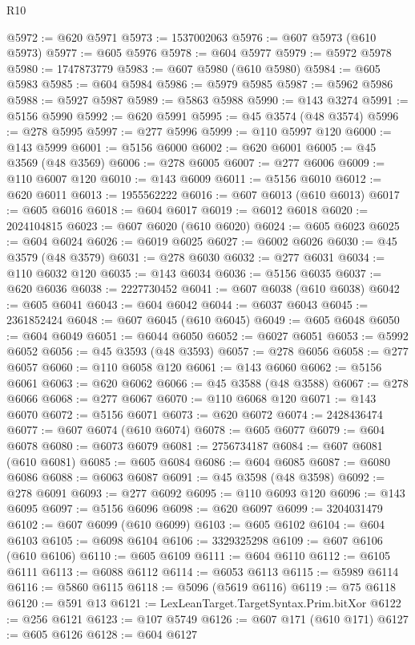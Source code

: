 \begin{lexlean}{R10}
\begin{coremodule}
{{{{{{{{{{{{{{{{{{{{{{{{{{{{{{{{{{{{{{{{{{{{{{{{{{{{{{{{{{{{{{{{{{{{{{{{{{{{{{{{{{{{@5972 := @620 @5971
@5973 := 1537002063
@5976 := @607 @5973 (@610 @5973)
@5977 := @605 @5976
@5978 := @604 @5977
@5979 := @5972 @5978
@5980 := 1747873779
@5983 := @607 @5980 (@610 @5980)
@5984 := @605 @5983
@5985 := @604 @5984
@5986 := @5979 @5985
@5987 := @5962 @5986
@5988 := @5927 @5987
@5989 := @5863 @5988
@5990 := @143 @3274
@5991 := @5156 @5990
@5992 := @620 @5991
@5995 := @45 @3574 (@48 @3574)
@5996 := @278 @5995
@5997 := @277 @5996
@5999 := @110 @5997 @120
@6000 := @143 @5999
@6001 := @5156 @6000
@6002 := @620 @6001
@6005 := @45 @3569 (@48 @3569)
@6006 := @278 @6005
@6007 := @277 @6006
@6009 := @110 @6007 @120
@6010 := @143 @6009
@6011 := @5156 @6010
@6012 := @620 @6011
@6013 := 1955562222
@6016 := @607 @6013 (@610 @6013)
@6017 := @605 @6016
@6018 := @604 @6017
@6019 := @6012 @6018
@6020 := 2024104815
@6023 := @607 @6020 (@610 @6020)
@6024 := @605 @6023
@6025 := @604 @6024
@6026 := @6019 @6025
@6027 := @6002 @6026
@6030 := @45 @3579 (@48 @3579)
@6031 := @278 @6030
@6032 := @277 @6031
@6034 := @110 @6032 @120
@6035 := @143 @6034
@6036 := @5156 @6035
@6037 := @620 @6036
@6038 := 2227730452
@6041 := @607 @6038 (@610 @6038)
@6042 := @605 @6041
@6043 := @604 @6042
@6044 := @6037 @6043
@6045 := 2361852424
@6048 := @607 @6045 (@610 @6045)
@6049 := @605 @6048
@6050 := @604 @6049
@6051 := @6044 @6050
@6052 := @6027 @6051
@6053 := @5992 @6052
@6056 := @45 @3593 (@48 @3593)
@6057 := @278 @6056
@6058 := @277 @6057
@6060 := @110 @6058 @120
@6061 := @143 @6060
@6062 := @5156 @6061
@6063 := @620 @6062
@6066 := @45 @3588 (@48 @3588)
@6067 := @278 @6066
@6068 := @277 @6067
@6070 := @110 @6068 @120
@6071 := @143 @6070
@6072 := @5156 @6071
@6073 := @620 @6072
@6074 := 2428436474
@6077 := @607 @6074 (@610 @6074)
@6078 := @605 @6077
@6079 := @604 @6078
@6080 := @6073 @6079
@6081 := 2756734187
@6084 := @607 @6081 (@610 @6081)
@6085 := @605 @6084
@6086 := @604 @6085
@6087 := @6080 @6086
@6088 := @6063 @6087
@6091 := @45 @3598 (@48 @3598)
@6092 := @278 @6091
@6093 := @277 @6092
@6095 := @110 @6093 @120
@6096 := @143 @6095
@6097 := @5156 @6096
@6098 := @620 @6097
@6099 := 3204031479
@6102 := @607 @6099 (@610 @6099)
@6103 := @605 @6102
@6104 := @604 @6103
@6105 := @6098 @6104
@6106 := 3329325298
@6109 := @607 @6106 (@610 @6106)
@6110 := @605 @6109
@6111 := @604 @6110
@6112 := @6105 @6111
@6113 := @6088 @6112
@6114 := @6053 @6113
@6115 := @5989 @6114
@6116 := @5860 @6115
@6118 := @5096 (@5619 @6116)
@6119 := @75 @6118
@6120 := @591 @13
@6121 := LexLeanTarget.TargetSyntax.Prim.bitXor
@6122 := @256 @6121
@6123 := @107 @5749
@6126 := @607 @171 (@610 @171)
@6127 := @605 @6126
@6128 := @604 @6127
}}}}}}}}}}}}}}}}}}}}}}}}}}}}}}}}}}}}}}}}}}}}}}}}}}}}}}}}}}}}}}}}}}}}}}}}}}}}}}}}}}}}
\end{coremodule}
\end{lexlean}
